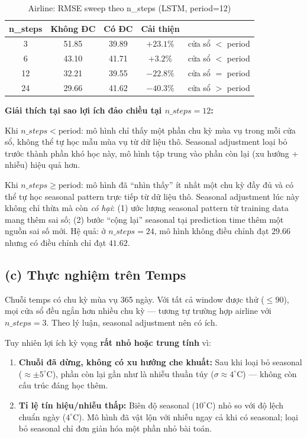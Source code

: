 \documentclass[12pt,a4paper]{article}
\begin{document}
\begin{table}[H]
\centering
\caption{Airline: RMSE sweep theo n\_steps (LSTM, period=12)}
\begin{tabular}{ccccc}
\toprule
\textbf{n\_steps} & \textbf{Không ĐC} & \textbf{Có ĐC} & \textbf{Cải thiện} & \\
\midrule
3  & 51.85 & 39.89 & $+23.1\%$ & cửa sổ $< $ period \\
6  & 43.10 & 41.71 & $+3.2\%$  & cửa sổ $< $ period \\
12 & 32.21 & 39.55 & $-22.8\%$ & cửa sổ $= $ period \\
24 & 29.66 & 41.62 & $-40.3\%$ & cửa sổ $> $ period \\
\bottomrule
\end{tabular}
\end{table}

\textbf{Giải thích tại sao lợi ích đảo chiều tại $n\_steps = 12$:}

Khi $n\_steps < \text{period}$: mô hình chỉ thấy một phần chu kỳ mùa vụ trong mỗi cửa sổ, không thể tự học mẫu mùa vụ từ dữ liệu thô. Seasonal adjustment loại bỏ trước thành phần khó học này, mô hình tập trung vào phần còn lại (xu hướng + nhiễu) hiệu quả hơn.

Khi $n\_steps \geq \text{period}$: mô hình đã ``nhìn thấy'' ít nhất một chu kỳ đầy đủ và có thể tự học seasonal pattern trực tiếp từ dữ liệu thô. Seasonal adjustment lúc này không chỉ thừa mà còn \textit{có hại}: (1) ước lượng seasonal pattern từ training data mang thêm sai số; (2) bước ``cộng lại'' seasonal tại prediction time thêm một nguồn sai số mới. Hệ quả: ở $n\_steps=24$, mô hình không điều chỉnh đạt $29.66$ nhưng có điều chỉnh chỉ đạt $41.62$.

\subsection{(c) Thực nghiệm trên Temps}

Chuỗi temps có chu kỳ mùa vụ 365 ngày. Với tất cả window được thử ($\leq 90$), mọi cửa sổ đều ngắn hơn nhiều chu kỳ --- tương tự trường hợp airline với $n\_steps = 3$. Theo lý luận, seasonal adjustment nên có ích.

Tuy nhiên lợi ích kỳ vọng \textbf{rất nhỏ hoặc trung tính} vì:

\begin{enumerate}
    \item \textbf{Chuỗi đã dừng, không có xu hướng che khuất:} Sau khi loại bỏ seasonal ($\approx \pm 5^\circ$C), phần còn lại gần như là nhiễu thuần túy ($\sigma \approx 4^\circ$C) --- không còn cấu trúc đáng học thêm.
    \item \textbf{Tỉ lệ tín hiệu/nhiễu thấp:} Biên độ seasonal ($10^\circ$C) nhỏ so với độ lệch chuẩn ngày ($4^\circ$C). Mô hình đã vật lộn với nhiễu ngay cả khi có seasonal; loại bỏ seasonal chỉ đơn giản hóa một phần nhỏ bài toán.
\end{enumerate}
\end{document}
